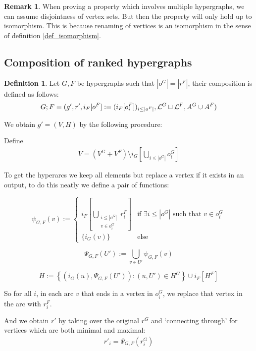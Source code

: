 \documentclass[12pt]{article}
\theoremstyle{definition}
\newtheorem{definition}[theorem]{Definition}
\newtheorem{remark}[theorem]{Remark}
\newcommand{\defeq}{\vcentcolon=}
\newcommand{\1}{\mathbbm{1}}
\renewcommand{\L}{\mathcal{L}}
\newcommand{\seq}{;}
\begin{document}
\begin{remark}\label{rem_rename}
    When proving a property which involves multiple hypergraphs, we can assume disjointness of vertex sets. But then the property will only hold up to isomorphism. This is because renaming of vertices is an isomorphism in the sense of definition \ref{def_isomorphism}.
\end{remark}

\subsection{Composition of ranked hypergraphs}
\begin{definition}\label{def_seq_comp}
Let $G, F$ be hypergraphs such that $|o^G| = |r^F|$, their composition is defined as follows:
\begin{align}
    G\seq F = (g', r', i_F[o^F] \defeq (i_F[o_i^F])_{i\leq |o^F|}, \L^G\sqcup \L^F, A^G\cup A^F)
\end{align}

We obtain $g' = (V,H)$ by the following procedure:

Define 
\begin{align*}
    V = (V^G + V^F) \setminus i_G[\bigcup_{i\leq |o^G|}o^G_i]
\end{align*}

To get the hyperarcs we keep all elements but replace a vertex if it exists in an output, to do this neatly we define a pair of functions:

\[
\psi_{G,F}(v) := 
\begin{cases}
    i_F[\displaystyle\bigcup_{\substack{i\leq |o^G| \\ v \in o^G_i}} r^F_i] & \text{if } \exists i \leq |o^G| \text{ such that } v \in o^G_i \\
    \{i_G(v)\} & \text{else}
\end{cases}
\]

\[
\Psi_{G, F}(U') := \bigcup_{v \in U'} \psi_{G, F}(v)
\]

\[
H := \left\{ \left(i_G(u), \Psi_{G, F}(U')\right) : (u, U') \in H^G \right\} \cup i_F[H^F]
\]

So for all $i$, in each arc $v$ that ends in a vertex in $o_i^G$, we replace that vertex in the arc with $r_i^F$. 

And we obtain $r'$ by taking over the original $r^G$ and `connecting through' for vertices which are both minimal and maximal:
\begin{align*}
    r'_i = \Psi_{G, F}(r^G_i)
\end{align*}
\end{definition} %
\end{document}
